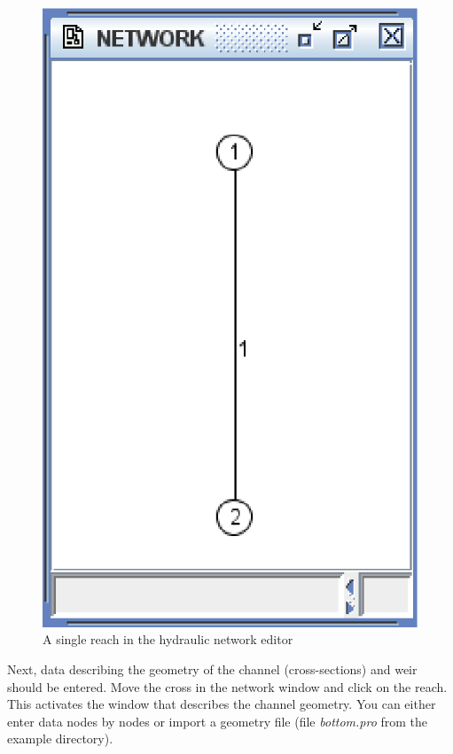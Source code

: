 \documentclass[a4paper,12pt]{article}
\begin{document}
\begin{figure}[h]
  \begin{center}
  \includegraphics[scale=0.5]{single_reach}
  \caption{A single reach in the hydraulic network editor}
  \label{fig:Single-reach-in}
  \end{center}
\end{figure}

Next, data describing the geometry of the channel (cross-sections) and weir should be entered. Move the cross in the network window and click on the reach. This activates 
the window that describes the channel geometry. You can either enter data nodes by nodes
or import a geometry file (file \textit{bottom.pro}
from the example directory).
\end{document}
